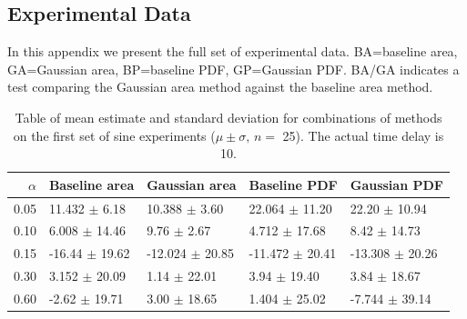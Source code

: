 \documentclass[a4paper,11pt]{article}
\begin{document}
\begin{appendices}
\section{Experimental Data}
\label{sec-11}

  In this appendix we present the full set of experimental data. BA=baseline area,
  GA=Gaussian area, BP=baseline PDF, GP=Gaussian PDF. BA/GA indicates a test
  comparing the Gaussian area method against the baseline area method.

  \begin{table}[htb]

  \begin{center}
  \begin{tabular}{r|llll}
  $\alpha$  &  Baseline area       &  Gaussian area        &  Baseline PDF         &  Gaussian PDF         \\
  \hline
  0.05  &  11.432 $\pm$ 6.18   &  10.388 $\pm$ 3.60    &  22.064 $\pm$ 11.20   &  22.20 $\pm$ 10.94    \\
  0.10  &  6.008 $\pm$ 14.46   &  9.76 $\pm$ 2.67      &  4.712 $\pm$ 17.68    &  8.42 $\pm$ 14.73     \\
  0.15  &  -16.44 $\pm$ 19.62  &  -12.024 $\pm$ 20.85  &  -11.472 $\pm$ 20.41  &  -13.308 $\pm$ 20.26  \\
  0.30  &  3.152 $\pm$ 20.09   &  1.14 $\pm$ 22.01     &  3.94 $\pm$ 19.40     &  3.84 $\pm$ 18.67     \\
  0.60  &  -2.62 $\pm$ 19.71   &  3.00 $\pm$ 18.65     &  1.404 $\pm$ 25.02    &  -7.744 $\pm$ 39.14   \\
  \end{tabular}
  \end{center} \caption{Table of mean estimate and standard deviation for
  combinations of methods on the first set of sine experiments ($\mu\pm\sigma,\,
  n=$ 25). The actual time delay is 10.} \label{tbl:sine1}\end{table}


  \begin{table}[htb]


\end{table}
\end{appendices}
\end{document}
